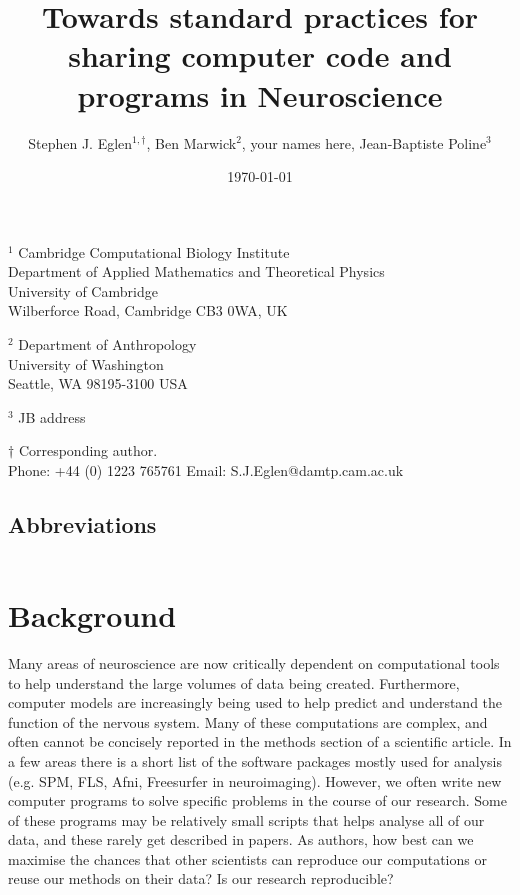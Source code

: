 \documentclass[11pt]{article}
\begin{document}
\doublespacing

\title{Towards standard practices for sharing computer code and programs in Neuroscience}

\author{Stephen J. Eglen$^{1,\dagger}$, Ben Marwick${^2}$, your names here, Jean-Baptiste Poline${^3}$}
\date{\today}
\maketitle

\noindent $^{1}$ 
Cambridge Computational Biology Institute\\
Department of Applied Mathematics and Theoretical Physics\\
University of Cambridge\\
Wilberforce Road, Cambridge CB3 0WA, UK
\vspace*{2mm}

\noindent $^{2}$ 
Department of Anthropology\\
University of Washington\\
Seattle, WA 98195-3100 USA 
\vspace*{2mm}

\noindent $^3$ JB address

\vspace*{2mm}


\noindent $\dagger$
Corresponding author.\\
\noindent Phone: +44 (0) 1223 765761
\noindent Email: S.J.Eglen@damtp.cam.ac.uk



\vspace*{2cm}
\subsection*{Abbreviations}
\begin{tabular}{ll}
\end{tabular}


\clearpage


\renewcommand{\cite}[1]{\autocite{#1}}

\linenumbers

\section*{Background}

Many areas of neuroscience are now critically dependent on
computational tools to help understand the large volumes of data being
created.  Furthermore, computer models are increasingly being used to
help predict and understand the function of the nervous system.  Many
of these computations are complex, and often cannot be concisely
reported in the methods section of a scientific article.  In a few
areas there is a short list of the software packages mostly used for
analysis (e.g. SPM, FLS, Afni, Freesurfer in neuroimaging).  However,
we often write new computer programs to solve specific problems in the
course of our research.  Some of these programs may be relatively
small scripts that helps analyse all of our data, and these rarely get
described in papers.  As authors, how best can we maximise the chances
that other scientists can reproduce our computations or reuse our
methods on their data?  Is our research reproducible?
\end{document}
